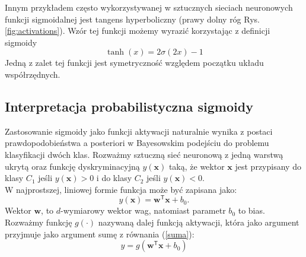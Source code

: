 \documentclass[11pt]{book}
\theoremstyle{definition}
\begin{document}
Innym przykładem często wykorzystywanej w sztucznych sieciach neuronowych funkcji sigmoidalnej jest tangens hyperboliczny (prawy dolny róg Rys. \ref{fig:activations}). Wzór tej funkcji możemy wyrazić korzystając z definicji sigmoidy
\begin{equation}
\tanh(x) = 2\sigma(2x)-1
\end{equation}
%
Jedną z zalet tej funkcji jest symetryczność względem początku układu współrzędnych.
%
\subsection{Interpretacja probabilistyczna sigmoidy}
%
Zastosowanie sigmoidy jako funkcji aktywacji naturalnie wynika z postaci prawdopodobieństwa a posteriori w Bayesowskim podejściu do problemu klasyfikacji dwóch klas.
%
Rozważmy sztuczną sieć neuronową z jedną warstwą ukrytą oraz funkcję dyskryminacyjną $y(\mathbf{x})$ taką, że wektor $\mathbf{x}$ jest przypisany do klasy $C_1$ jeśli $y(\mathbf{x}) > 0$ i do klasy $C_2$ jeśli $y(\mathbf{x}) < 0$.
\\
W najprostszej, liniowej formie funkcja może być zapisana jako:
%
\begin{equation}
y(\mathbf{x}) = \mathbf{w}^\mathsf{T} \mathbf{x} + b_0.
\end{equation}
%
Wektor $\mathbf{w}$, to $d$-wymiarowy wektor wag, natomiast parametr $b_0$ to bias.
%
Rozważmy funkcję $g(\cdot)$ nazywaną dalej funkcją aktywacji, która jako argument przyjmuje jako argument sumę z równania (\ref{suma}):
%
\begin{equation}
y = g\left(\mathbf{w}^\mathsf{T} \mathbf{x} + b_0 \right)
\label{suma}
\end{equation}
%
\def\layersep{2.5cm}
\end{document}
